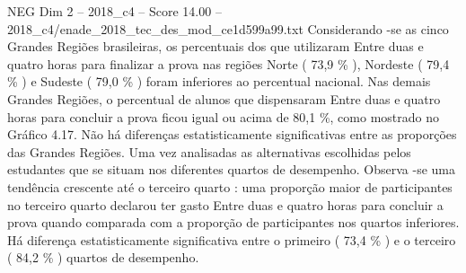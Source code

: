 \begin{textsample}{NEG Dim 2 – 2018\_c4 – Score 14.00 – 2018\_c4/enade\_2018\_tec\_des\_mod\_ce1d599a99.txt}
Considerando -se as cinco Grandes Regiões brasileiras, os percentuais dos que utilizaram Entre duas e quatro horas para finalizar a prova nas regiões Norte ( 73,9 \% ), Nordeste ( 79,4 \% ) e Sudeste ( 79,0 \% ) foram inferiores ao percentual nacional.
Nas demais Grandes Regiões, o percentual de alunos que dispensaram Entre duas e quatro horas para concluir a prova ficou igual ou acima de 80,1 \%, como mostrado no Gráfico 4.17.
Não há diferenças estatisticamente significativas entre as proporções das Grandes Regiões.
Uma vez analisadas as alternativas escolhidas pelos estudantes que se situam nos diferentes quartos de desempenho.
Observa -se uma tendência crescente até o terceiro quarto : uma proporção maior de participantes no terceiro quarto declarou ter gasto Entre duas e quatro horas para concluir a prova quando comparada com a proporção de participantes nos quartos inferiores.
Há diferença estatisticamente significativa entre o primeiro ( 73,4 \% ) e o terceiro ( 84,2 \% ) quartos de desempenho.

\end{textsample}
